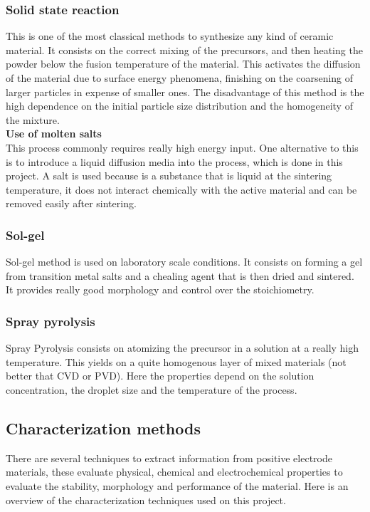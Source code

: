 \documentclass{article}
\begin{document}
\subsubsection{Solid state reaction}
This is one of the most classical methods to synthesize any kind of ceramic material. 
It consists on the correct mixing of the precursors, and then heating the powder below the fusion temperature of the material.
This activates the diffusion of the material due to surface energy phenomena, finishing on the coarsening of larger particles
in expense of smaller ones. The disadvantage of this method is the high dependence on the initial particle size distribution and 
the homogeneity of the mixture\cite{process}.\\
\textbf{Use of molten salts}\\ 
This process commonly requires really high energy input. One alternative to this 
is to introduce a liquid diffusion media into the process, which is done in this project. A salt is used
because is a substance that is liquid at the sintering temperature, it does not interact chemically with the active 
material and can be removed easily after sintering\cite{process}. \\
\subsubsection{Sol-gel}
Sol-gel method is used on laboratory scale conditions. It consists on forming a gel from transition 
metal salts and a chealing agent that is then dried and sintered. It provides really good morphology and control over the stoichiometry\cite{process}.
\subsubsection{Spray pyrolysis}
Spray Pyrolysis consists on atomizing the precursor in a solution at a really high temperature. This yields on a 
quite homogenous layer of mixed materials (not better that CVD or PVD). Here the properties depend on the solution concentration, the 
droplet size and the temperature of the process\cite{process}.\\ 
\subsection{Characterization methods}
There are several techniques to extract information from positive electrode materials,
these evaluate physical, chemical and electrochemical properties to evaluate the stability, morphology 
and performance of the material. Here is an overview of the characterization techniques used on this project.\\
\end{document}
